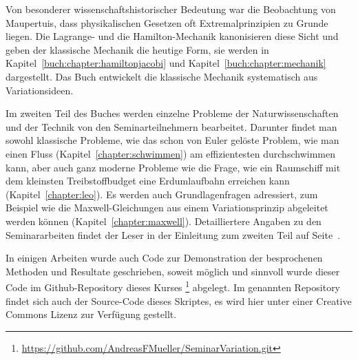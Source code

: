 Von besonderer wissenschaftshistorischer Bedeutung war die Beobachtung
von Maupertuis, dass physikalischen Gesetzen oft Extremalprinzipien zu
Grunde liegen.
Die La\-grange- und die Hamilton-Mechanik kanonisieren diese Sicht und geben
der klassische Mechanik die heutige Form, sie werden in
Kapitel~\ref{buch:chapter:hamiltonjacobi}
und
Kapitel~\ref{buch:chapter:mechanik}
dargestellt.
Das Buch \cite{buch:levi} entwickelt die klassische Mechanik systematisch
aus Variationsideen.

Im zweiten Teil des Buches werden einzelne Probleme der Naturwissenschaften
und der Technik von den Seminarteilnehmern bearbeitet.
Darunter findet man sowohl klassische Probleme, wie das schon von
Euler gelöste Problem, wie man einen Fluss (Kapitel~\ref{chapter:schwimmen})
am effizientesten durchschwimmen
kann, aber auch ganz moderne Probleme wie die Frage, wie ein
Raumschiff mit dem kleinsten Treibstoffbudget eine Erdumlaufbahn
erreichen kann (Kapitel~\ref{chapter:leo}).
Es werden auch Grundlagenfragen adressiert, zum Beispiel wie
die Maxwell-Gleichungen aus einem Variationsprinzip abgeleitet werden
können (Kapitel~\ref{chapter:maxwell}).
Detailliertere Angaben zu den Seminararbeiten findet der Leser in der
Einleitung zum zweiten Teil auf Seite~\pageref{buch:part2:anwendungen}.

In einigen Arbeiten wurde auch Code zur Demonstration der 
besprochenen Methoden und Resultate geschrieben, soweit
möglich und sinnvoll wurde dieser Code im Github-Repository
%
dieses Kurses%
\footnote{\url{https://github.com/AndreasFMueller/SeminarVariation.git}}
\cite{buch:repo}
abgelegt.
Im genannten Repository findet sich auch der Source-Code dieses
Skriptes, es wird hier unter einer Creative Commons Lizenz
zur Verfügung gestellt.

